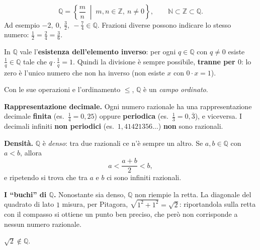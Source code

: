 \documentclass[11pt,a4paper]{article}
\theoremstyle{definition}
\begin{document}
\[
\mathbb{Q} = \left\{ \frac{m}{n} \;\middle|\; m, n \in \mathbb{Z},\ n \neq 0 \right\},
\qquad \mathbb{N} \subset \mathbb{Z} \subset \mathbb{Q}.
\]
Ad esempio $-2,\ 0,\ \frac{3}{2},\ -\frac{7}{4} \in \mathbb{Q}$.
Frazioni diverse possono indicare lo stesso numero:
$\frac12 = \frac24 = \frac36$.

In $\mathbb{Q}$ vale l'\textbf{esistenza dell'elemento inverso}: per ogni
$q \in \mathbb{Q}$ con $q \neq 0$ esiste $\frac{1}{q} \in \mathbb{Q}$ tale
che $q \cdot \frac{1}{q} = 1$. Quindi la divisione è sempre possibile,
\textbf{tranne per $0$}: lo zero è l'unico numero che non ha inverso
(non esiste $x$ con $0 \cdot x = 1$).

Con le sue operazioni e l'ordinamento $\leq$, $\mathbb{Q}$ è un
\emph{campo ordinato}.

\textbf{Rappresentazione decimale.} Ogni numero razionale ha una
rappresentazione decimale \textbf{finita} (es.\ $\frac14 = 0{,}25$) oppure
\textbf{periodica} (es.\ $\frac13 = 0{,}\overline{3}$), e viceversa.
I decimali infiniti \textbf{non periodici} (es.\ $1{,}41421356\dots$)
\textbf{non} sono razionali.

\textbf{Densità.} $\mathbb{Q}$ è \emph{denso}: tra due razionali ce n'è
sempre un altro. Se $a, b \in \mathbb{Q}$ con $a < b$, allora
\[
a < \frac{a + b}{2} < b,
\]
e ripetendo si trova che tra $a$ e $b$ ci sono infiniti razionali.

\textbf{I ``buchi'' di $\mathbb{Q}$.} Nonostante sia denso, $\mathbb{Q}$
non riempie la retta. La diagonale del quadrato di lato $1$ misura, per
Pitagora, $\sqrt{1^2 + 1^2} = \sqrt{2}$: riportandola sulla retta con il
compasso si ottiene un punto ben preciso, che però non corrisponde a nessun
numero razionale.

\begin{center}
\end{center}

\begin{teorema}
$\sqrt{2} \notin \mathbb{Q}$.
\end{teorema}
\end{document}
